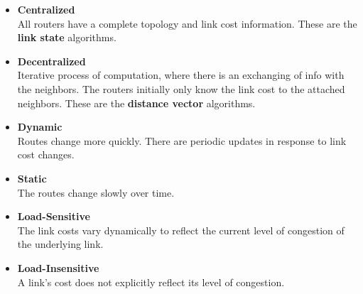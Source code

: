 \documentclass{article}
\begin{document}
\begin{itemize}
	\item \textbf{Centralized}
	\vspace{.2cm} \\
	All routers have a complete topology and link cost information. These are the \textbf{link state} algorithms.
	
	\item \textbf{Decentralized}
	\vspace{.2cm} \\
	Iterative process of computation, where there is an exchanging of info with the neighbors. The routers initially only know the link cost to the attached neighbors. These are the \textbf{distance vector} algorithms.
	
	\item \textbf{Dynamic}
	\vspace{.2cm} \\
	Routes change more quickly. There are periodic updates in response to link cost changes.
	
	\item \textbf{Static}
	\vspace{.2cm} \\
	The routes change slowly over time.
	
	\item \textbf{Load-Sensitive}
	\vspace{.2cm} \\
	The link costs vary dynamically to reflect the current level of congestion of the underlying link.
	
	\item \textbf{Load-Insensitive}
	\vspace{.2cm} \\
	A link's cost does not explicitly reflect its level of congestion.
\end{itemize}
\end{document}
